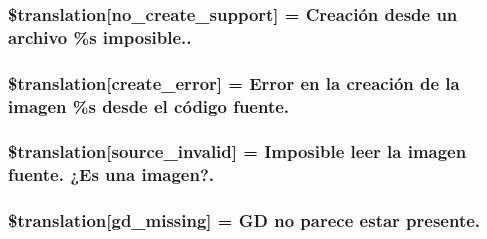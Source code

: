 \subsubsection[{\$translation}]{\setlength{\rightskip}{0pt plus 5cm}\$translation\mbox{[}\textquotesingle{}no\+\_\+create\+\_\+support\textquotesingle{}\mbox{]} = \textquotesingle{}Creación desde un archivo \%s imposible..\textquotesingle{}}\label{class_8upload_8es___e_s_8php_a346dfd1ade29f583dd20d345c436859f}
\hypertarget{class_8upload_8es___e_s_8php_a53013ce9255c4e1849098ddd9fdb2b3f}{}
\subsubsection[{\$translation}]{\setlength{\rightskip}{0pt plus 5cm}\$translation\mbox{[}\textquotesingle{}create\+\_\+error\textquotesingle{}\mbox{]} = \textquotesingle{}Error en la creación de la imagen \%s desde el código fuente.\textquotesingle{}}\label{class_8upload_8es___e_s_8php_a53013ce9255c4e1849098ddd9fdb2b3f}
\hypertarget{class_8upload_8es___e_s_8php_a6ab0a660b457eaf2d3434b225449fdd6}{}
\subsubsection[{\$translation}]{\setlength{\rightskip}{0pt plus 5cm}\$translation\mbox{[}\textquotesingle{}source\+\_\+invalid\textquotesingle{}\mbox{]} = \textquotesingle{}Imposible leer la imagen fuente. ¿\+Es una imagen?.\textquotesingle{}}\label{class_8upload_8es___e_s_8php_a6ab0a660b457eaf2d3434b225449fdd6}
\hypertarget{class_8upload_8es___e_s_8php_a7f3dfcc0db4bbc0f2e7210c439798e56}{}
\subsubsection[{\$translation}]{\setlength{\rightskip}{0pt plus 5cm}\$translation\mbox{[}\textquotesingle{}gd\+\_\+missing\textquotesingle{}\mbox{]} = \textquotesingle{}G\+D no parece estar presente.\textquotesingle{}}\label{class_8upload_8es___e_s_8php_a7f3dfcc0db4bbc0f2e7210c439798e56}
\hypertarget{class_8upload_8es___e_s_8php_a82d5853430ab72dc1f9799ec36144cc6}{}
